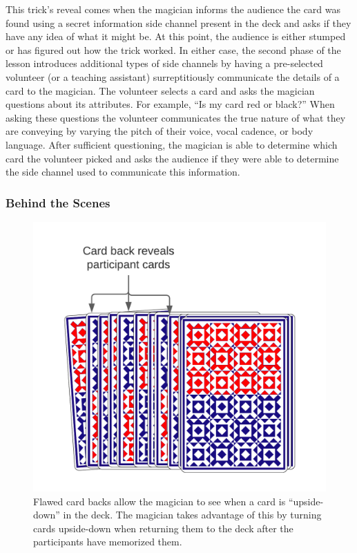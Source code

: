 This trick's reveal comes when the magician informs the audience
the card was found using a secret information side channel present in the
deck and asks if they have any idea of what it might be.
At this point, the audience is either stumped or has figured out how the trick
worked.  In either case,  the second phase of the lesson
introduces additional types of side channels
by having a pre-selected volunteer (or a teaching assistant)
surreptitiously
communicate the details of a card
to the magician.
The volunteer selects a card and asks the magician questions about its
attributes.
For example, ``Is my card red or black?''
When asking these questions the volunteer communicates the true nature of
what they are conveying
by varying the pitch of their voice, vocal cadence, or body language.
After sufficient questioning, the magician is able to determine which card the
volunteer picked and asks the audience if they were able to determine the side
channel used to communicate this information.

\subsubsection{Behind the Scenes}

\begin{figure}[H]
\centering
\includegraphics[scale=.7]{images/Trick2}
\caption{Flawed card backs allow the magician to see when a card is
``upside-down'' in the deck.  The magician takes advantage of this by
  turning cards upside-down when returning
  them to the deck after the participants have memorized them.}
\label{fig:trick2}
\end{figure}

